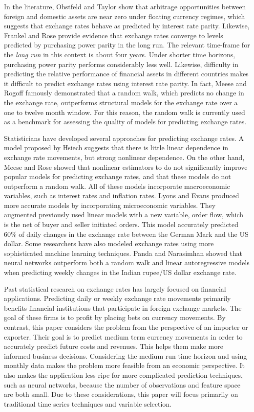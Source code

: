 \documentclass{sig-alternate-05-2015}
\begin{document}
\par{} In the literature, Obstfeld and Taylor show that arbitrage opportunities between foreign and domestic assets are near zero under floating currency regimes, which suggests that exchange rates behave as predicted by interest rate parity. Likewise, Frankel and Rose provide evidence that exchange rates converge to levels predicted by purchasing power parity in the long run. The relevant time-frame for the \emph{long run} in this context is about four years. Under shorter time horizons, purchasing power parity performs considerably less well. Likewise, difficulty in predicting the relative performance of financial assets in different countries makes it difficult to predict exchange rates using interest rate parity. In fact, Meese and Rogoff famously demonstrated that a random walk, which predicts no change in the exchange rate, outperforms structural models for the exchange rate over a one to twelve month window. For this reason, the random walk is currently used as a benchmark for assessing the quality of models for predicting exchange rates.
\par{} Statisticians have developed several approaches for predicting exchange rates. A model proposed by Hsiech suggests that there is little linear dependence in exchange rate movements, but strong nonlinear dependence. On the other hand, Meese and Rose showed that nonlinear estimators to do not significantly improve popular models for predicting exchange rates, and that these models do not outperform a random walk. All of these models incorporate macroeconomic variables, such as interest rates and inflation rates. Lyons and Evans produced more accurate models by incorporating microeconomic variables. They augmented previously used linear models with a new variable, order flow, which is the net of buyer and seller initiated orders. This model accurately predicted 60\% of daily changes in the exchange rate between the German Mark and the US dollar. Some researchers have also modeled exchange rates using more sophisticated machine learning techniques. Panda and Narasimhan showed that neural networks outperform both a random walk and linear autoregressive models when predicting weekly changes in the Indian rupee/US dollar exchange rate.
\par{} Past statistical research on exchange rates has largely focused on financial applications. Predicting daily or weekly exchange rate movements primarily benefits financial institutions that participate in foreign exchange markets. The goal of these firms is to profit by placing bets on currency movements. By contrast, this paper considers the problem from the perspective of an importer or exporter. Their goal is to predict medium term currency movements in order to accurately predict future costs and revenues. This helps them make more informed business decisions. Considering the medium run time horizon and using monthly data makes the problem more feasible from an economic perspective. It also makes the application less ripe for more complicated prediction techniques, such as neural networks, because the number of observations and feature space are both small. Due to these considerations, this paper will focus primarily on traditional time series techniques and variable selection.
\end{document}
